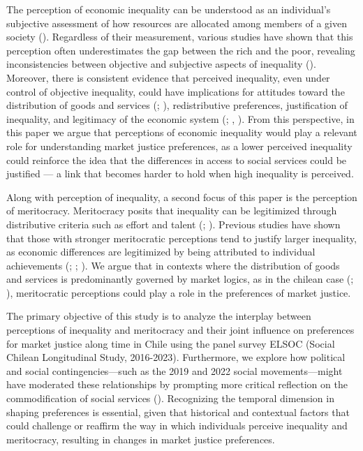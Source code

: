\documentclass[
  12pt,
]{article}
\begin{document}
The perception of economic inequality can be understood as an
individual's subjective assessment of how resources are allocated among
members of a given society (). Regardless of their measurement, various studies have shown that
this perception often underestimates the gap between the rich and the
poor, revealing inconsistencies between objective and subjective aspects
of inequality (). Moreover,
there is consistent evidence that perceived inequality, even under
control of objective inequality, could have implications for attitudes
toward the distribution of goods and services
(;
), redistributive
preferences, justification of inequality, and legitimacy of the economic
system (;
, ). From this
perspective, in this paper we argue that perceptions of economic
inequality would play a relevant role for understanding market justice
preferences, as a lower perceived inequality could reinforce the idea
that the differences in access to social services could be justified ---
a link that becomes harder to hold when high inequality is perceived.

Along with perception of inequality, a second focus of this paper is the
perception of meritocracy. Meritocracy posits that inequality can be
legitimized through distributive criteria such as effort and talent
(;
). Previous studies have
shown that those with stronger meritocratic perceptions tend to justify
larger inequality, as economic differences are legitimized by being
attributed to individual achievements
(;
;
). We argue that in
contexts where the distribution of goods and services is predominantly
governed by market logics, as in the chilean case
(;
), meritocratic
perceptions could play a role in the preferences of market justice.

The primary objective of this study is to analyze the interplay between
perceptions of inequality and meritocracy and their joint influence on
preferences for market justice along time in Chile using the panel
survey ELSOC (Social Chilean Longitudinal Study, 2016-2023).
Furthermore, we explore how political and social contingencies---such as
the 2019 and 2022 social movements---might have moderated these
relationships by prompting more critical reflection on the
commodification of social services (). Recognizing the temporal dimension in shaping
preferences is essential, given that historical and contextual factors
that could challenge or reaffirm the way in which individuals perceive
inequality and meritocracy, resulting in changes in market justice
preferences.
\end{document}
